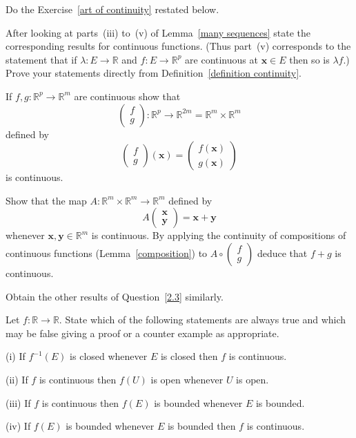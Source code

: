 \begin{question}\label{2.3}
Do the Exercise~\ref{art of continuity}
restated below.
 
After looking at parts~(iii) to~(v)
of Lemma~\ref{many sequences} state the corresponding
results for continuous functions. (Thus part~(v) 
corresponds to the statement that if 
$\lambda:E\rightarrow{\mathbb R}$ and 
$f:E\rightarrow{\mathbb R}^{p}$ are continuous
at ${\mathbf x}\in E$ then so is $\lambda f$.)
Prove your statements directly from 
Definition~\ref{definition continuity}.

\end{question}
\begin{question}
If $f,g:{\mathbb R}^{p}\rightarrow{\mathbb R}^{m}$
are continuous
show that 
\[\begin{pmatrix}
f\\g
\end{pmatrix}
:{\mathbb R}^{p}\rightarrow{\mathbb R}^{2m}
={\mathbb R}^{m}\times{\mathbb R}^{m}\]
defined by
\[\begin{pmatrix}
f\\g
\end{pmatrix}({\mathbf x})=
\begin{pmatrix}
f({\mathbf x})\\g({\mathbf x})
\end{pmatrix}\]
is continuous.

Show that the map $A:{\mathbb R}^{m}\times{\mathbb R}^{m}
\rightarrow {\mathbb R}^{m}$ defined by
\[A\begin{pmatrix}
\mathbf{x}\\ \mathbf{y}
\end{pmatrix}=\mathbf{x}+\mathbf{y}\]
whenever $\mathbf{x},\mathbf{y}\in {\mathbb R}^{m}$
is continuous. By applying the continuity of compositions
of continuous functions (Lemma~\ref{composition}) to 
${\displaystyle A\circ
\begin{pmatrix}
f\\g
\end{pmatrix}}$
deduce that $f+g$ is continuous.

Obtain the other results of Question~\ref{2.3} similarly. 

\end{question}
\begin{question}
Let $f:{\mathbb R}\rightarrow{\mathbb R}$.
State which of the following statements are always
true and which may be false giving a proof or a counter
example as appropriate.

(i) If $f^{-1}(E)$ is closed whenever $E$ is closed
then $f$ is continuous.

(ii) If $f$ is continuous then $f(U)$ is open whenever
$U$ is open.

(iii) If $f$ is continuous then $f(E)$ is bounded whenever
$E$ is bounded.

(iv) If $f(E)$ is bounded whenever
$E$ is bounded then $f$ is continuous.

\end{question}
